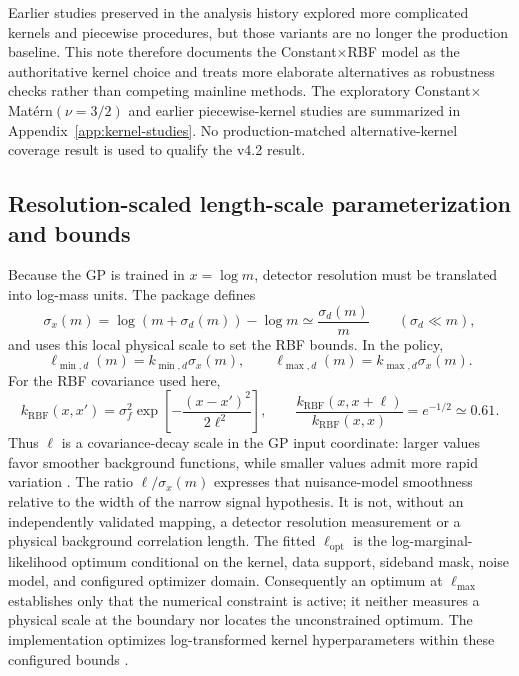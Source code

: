 Earlier studies preserved in the analysis history explored more complicated kernels and
piecewise procedures, but those variants are no longer the production baseline. This
note therefore documents the Constant$\times$RBF model as the authoritative kernel
choice and treats more elaborate alternatives as robustness checks rather than
competing mainline methods. The exploratory Constant$\times$Mat\'ern$(\nu=3/2)$ and
earlier piecewise-kernel studies are summarized in
Appendix~\ref{app:kernel-studies}. No production-matched alternative-kernel coverage
result is used to qualify the v4.2 result.

\subsection{Resolution-scaled length-scale parameterization and bounds}
\label{sec:length-scale}

Because the GP is trained in $x=\log m$, detector resolution must be translated into
log-mass units. The package defines
\begin{equation}
\sigma_x(m) = \log\!\left(m+\sigma_d(m)\right) - \log m
\simeq \frac{\sigma_d(m)}{m}
\qquad (\sigma_d \ll m),
\end{equation}
and uses this local physical scale to set the RBF bounds. In the
 policy,
\begin{equation}
\ell_{\min,d}(m) = k_{\min,d}\sigma_x(m),
\qquad
\ell_{\max,d}(m) = k_{\max,d}\sigma_x(m).
\label{eq:dataset-lengthscale-bounds}
\end{equation}
For the RBF covariance used here,
\begin{equation}
k_{\mathrm{RBF}}(x,x') =
\sigma_f^2\exp\!\left[-\frac{(x-x')^2}{2\ell^2}\right],
\qquad
\frac{k_{\mathrm{RBF}}(x,x+\ell)}{k_{\mathrm{RBF}}(x,x)}
=e^{-1/2}\simeq0.61 .
\label{eq:rbf-lengthscale-interpretation}
\end{equation}
Thus $\ell$ is a covariance-decay scale in the GP input coordinate: larger values
favor smoother background functions, while smaller values admit more rapid
variation \cite{RasmussenWilliams2006,FrateGP2017}. The ratio
$\ell/\sigma_x(m)$ expresses that nuisance-model smoothness relative to the width of
the narrow signal hypothesis. It is not, without an independently validated mapping,
a detector resolution measurement or a physical background correlation length.
The fitted $\ell_{\mathrm{opt}}$ is the log-marginal-likelihood optimum conditional
on the kernel, data support, sideband mask, noise model, and configured optimizer
domain. Consequently an optimum at $\ell_{\max}$ establishes only that the numerical
constraint is active; it neither measures a physical scale at the boundary nor
locates the unconstrained optimum. The implementation optimizes log-transformed
kernel hyperparameters within these configured bounds
\cite{ScikitLearnGPRDocs16}.

